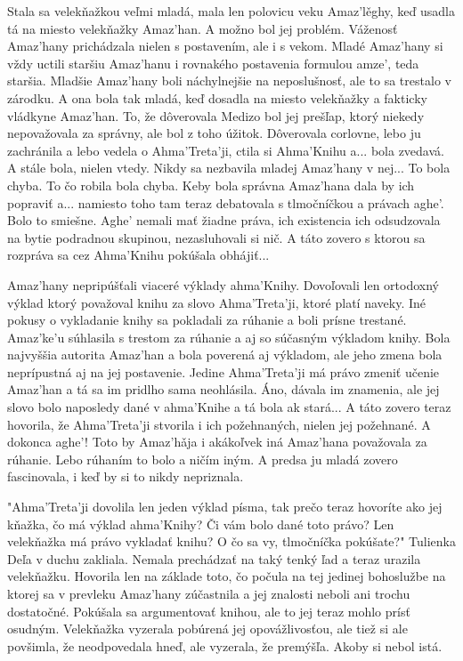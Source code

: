 \documentclass{book}
\begin{document}
Stala sa velekňažkou veľmi mladá, mala len polovicu veku Amaz'le\v{}ghy, keď usadla tá na miesto velekňažky Amaz'han. A možno bol jej problém. Váženosť Amaz'hany prichádzala nielen s postavením, ale i s vekom. Mladé Amaz'hany si vždy uctili staršiu Amaz'hanu i rovnakého postavenia formulou amze', teda staršia. Mladšie Amaz'hany boli náchylnejšie na neposlušnosť, ale to sa trestalo v zárodku. A ona bola tak mladá, keď dosadla na miesto velekňažky a fakticky vládkyne Amaz'han. To, že dôverovala Medizo bol jej prešľap, ktorý niekedy nepovažovala za správny, ale bol z toho úžitok. Dôverovala corlovne, lebo ju zachránila a lebo vedela o Ahma'Treta'ji, ctila si Ahma'Knihu a... bola zvedavá. A stále bola, nielen vtedy. Nikdy sa nezbavila mladej Amaz'hany v nej... To bola chyba. To čo robila bola chyba. Keby bola správna Amaz'hana dala by ich popraviť a... namiesto toho tam teraz debatovala s tlmočníčkou a právach aghe'. Bolo to smiešne. Aghe' nemali mať žiadne práva, ich existencia ich odsudzovala na bytie podradnou skupinou, nezasluhovali si nič. A táto zovero s ktorou sa rozpráva sa cez Ahma'Knihu pokúšala obhájiť...

Amaz'hany nepripúšťali viaceré výklady ahma'Knihy. Dovoľovali len ortodoxný výklad ktorý považoval knihu za slovo Ahma'Treta'ji, ktoré platí naveky. Iné pokusy o vykladanie knihy sa pokladali za rúhanie a boli prísne trestané. Amaz'ke'u súhlasila s trestom za rúhanie a aj so súčasným výkladom knihy. Bola najvyššia autorita Amaz'han a bola poverená aj výkladom, ale jeho zmena bola neprípustná aj na jej postavenie. Jedine Ahma'Treta'ji má právo zmeniť učenie Amaz'han a tá sa im pridlho sama neohlásila. Áno, dávala im znamenia, ale jej slovo bolo naposledy dané v ahma'Knihe a tá bola ak stará... A táto zovero teraz hovorila, že Ahma'Treta'ji stvorila i ich požehnaných, nielen jej požehnané. A dokonca aghe'! Toto by Amaz'ha\v{}ja i akákoľvek iná Amaz'hana považovala za rúhanie. Lebo rúhaním to bolo a ničím iným. A predsa ju mladá zovero fascinovala, i keď by si to nikdy nepriznala.

"$ $Ahma'Treta'ji dovolila len jeden výklad písma, tak prečo teraz hovoríte ako jej kňažka, čo má výklad ahma'Knihy? Či vám bolo dané toto právo? Len velekňažka má právo vykladať knihu? O čo sa vy, tlmočníčka pokúšate?"$ $ Tulienka Deľa v duchu zakliala. Nemala prechádzať na taký tenký ľad a teraz urazila velekňažku. Hovorila len na základe toto, čo počula na tej jedinej bohoslužbe na ktorej sa v prevleku Amaz'hany zúčastnila a jej znalosti neboli ani trochu dostatočné. Pokúšala sa argumentovať knihou, ale to jej teraz mohlo prísť osudným. Velekňažka vyzerala pobúrená jej opovážlivosťou, ale tiež si ale povšimla, že neodpovedala hneď, ale vyzerala, že premýšľa. Akoby si nebol istá.
\end{document}
